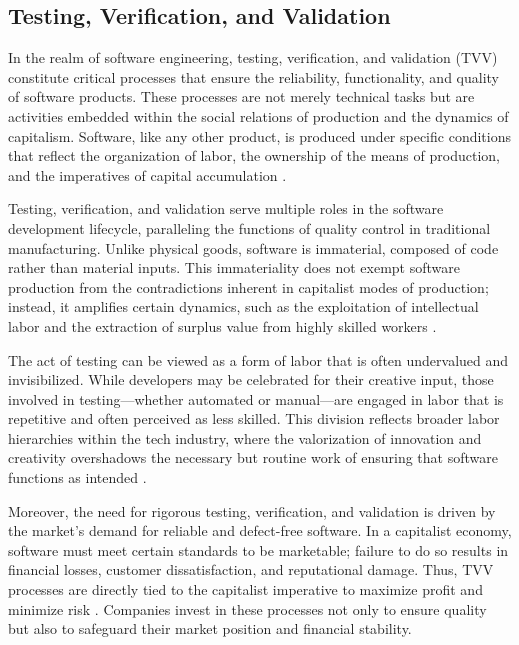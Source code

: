 \begin{refsection}
\section{Testing, Verification, and Validation}

In the realm of software engineering, testing, verification, and validation (TVV) constitute critical processes that ensure the reliability, functionality, and quality of software products. These processes are not merely technical tasks but are activities embedded within the social relations of production and the dynamics of capitalism. Software, like any other product, is produced under specific conditions that reflect the organization of labor, the ownership of the means of production, and the imperatives of capital accumulation \cite[pp.~125-130]{marx2008capital}.

Testing, verification, and validation serve multiple roles in the software development lifecycle, paralleling the functions of quality control in traditional manufacturing. Unlike physical goods, software is immaterial, composed of code rather than material inputs. This immateriality does not exempt software production from the contradictions inherent in capitalist modes of production; instead, it amplifies certain dynamics, such as the exploitation of intellectual labor and the extraction of surplus value from highly skilled workers \cite[pp.~57-63]{braverman1974labor}.

The act of testing can be viewed as a form of labor that is often undervalued and invisibilized. While developers may be celebrated for their creative input, those involved in testing—whether automated or manual—are engaged in labor that is repetitive and often perceived as less skilled. This division reflects broader labor hierarchies within the tech industry, where the valorization of innovation and creativity overshadows the necessary but routine work of ensuring that software functions as intended \cite[pp.~420-425]{fuchs2014digital}.

Moreover, the need for rigorous testing, verification, and validation is driven by the market's demand for reliable and defect-free software. In a capitalist economy, software must meet certain standards to be marketable; failure to do so results in financial losses, customer dissatisfaction, and reputational damage. Thus, TVV processes are directly tied to the capitalist imperative to maximize profit and minimize risk \cite[pp.~45-48]{huws2014labor}. Companies invest in these processes not only to ensure quality but also to safeguard their market position and financial stability.


\end{refsection}
